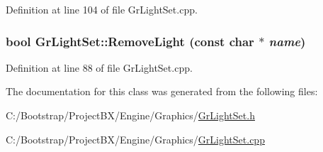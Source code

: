 Definition at line 104 of file GrLightSet.cpp.\hypertarget{class_gr_light_set_0f600be8bb1804bd6e6161399526fe33}{
\subsubsection[{RemoveLight}]{\setlength{\rightskip}{0pt plus 5cm}bool GrLightSet::RemoveLight (const char $\ast$ {\em name})}}
\label{class_gr_light_set_0f600be8bb1804bd6e6161399526fe33}




Definition at line 88 of file GrLightSet.cpp.

The documentation for this class was generated from the following files:\begin{CompactItemize}
\item 
C:/Bootstrap/ProjectBX/Engine/Graphics/\hyperlink{_gr_light_set_8h}{GrLightSet.h}\item 
C:/Bootstrap/ProjectBX/Engine/Graphics/\hyperlink{_gr_light_set_8cpp}{GrLightSet.cpp}\end{CompactItemize}

